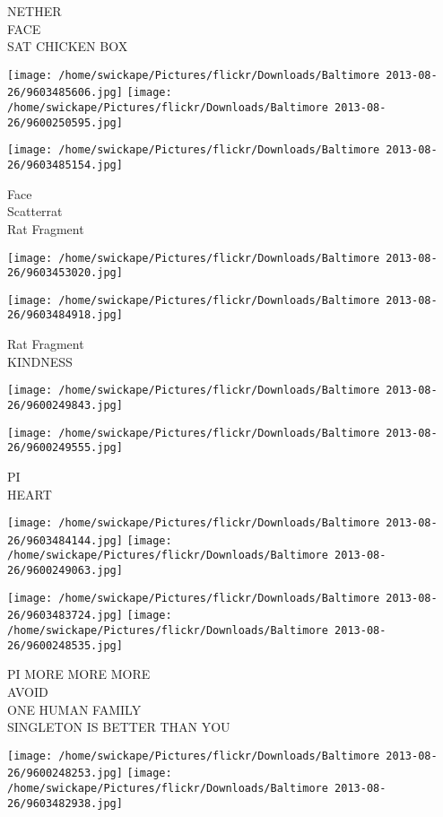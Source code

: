 \documentclass[10pt,letterpaper]{article}
\begin{document}
NETHER\\
FACE\\
SAT CHICKEN BOX
\pagebreak

\texttt{[image: /home/swickape/Pictures/flickr/Downloads/Baltimore 2013-08-26/9603485606.jpg]}
\texttt{[image: /home/swickape/Pictures/flickr/Downloads/Baltimore 2013-08-26/9600250595.jpg]}

\texttt{[image: /home/swickape/Pictures/flickr/Downloads/Baltimore 2013-08-26/9603485154.jpg]}

Face\\
Scatterrat\\
Rat Fragment
\pagebreak

\texttt{[image: /home/swickape/Pictures/flickr/Downloads/Baltimore 2013-08-26/9603453020.jpg]}

\vspace{0.25in}
\texttt{[image: /home/swickape/Pictures/flickr/Downloads/Baltimore 2013-08-26/9603484918.jpg]}

Rat Fragment\\
KINDNESS
\pagebreak

\texttt{[image: /home/swickape/Pictures/flickr/Downloads/Baltimore 2013-08-26/9600249843.jpg]}

\vspace{0.25in}
\texttt{[image: /home/swickape/Pictures/flickr/Downloads/Baltimore 2013-08-26/9600249555.jpg]}

PI\\
HEART
\pagebreak

\texttt{[image: /home/swickape/Pictures/flickr/Downloads/Baltimore 2013-08-26/9603484144.jpg]}
\texttt{[image: /home/swickape/Pictures/flickr/Downloads/Baltimore 2013-08-26/9600249063.jpg]}

\texttt{[image: /home/swickape/Pictures/flickr/Downloads/Baltimore 2013-08-26/9603483724.jpg]}
\texttt{[image: /home/swickape/Pictures/flickr/Downloads/Baltimore 2013-08-26/9600248535.jpg]}

PI MORE MORE MORE\\
AVOID\\
ONE HUMAN FAMILY\\
SINGLETON IS BETTER THAN YOU
\pagebreak

\texttt{[image: /home/swickape/Pictures/flickr/Downloads/Baltimore 2013-08-26/9600248253.jpg]}
\texttt{[image: /home/swickape/Pictures/flickr/Downloads/Baltimore 2013-08-26/9603482938.jpg]}
\end{document}

